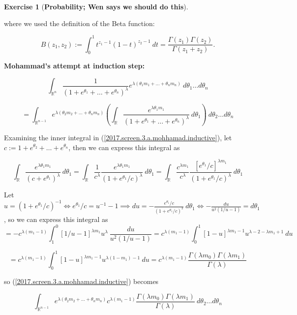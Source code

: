 \documentclass{article}
\theoremstyle{definition}
\newtheorem{exercise}{Exercise}
\theoremstyle{definition}
\theoremstyle{definition}
\theoremstyle{definition}
\begin{document}
\begin{exercise}[\textbf{Probability; Wen says we should do this}]
\begin{enumerate}[(a)]
where we used the definition of the Beta function:

\[
B(z_1, z_2) := \int_0^1 t^{z_1 - 1} (1-t)^{z_2 - 1} \ dt= \frac{ \Gamma(z_1) \Gamma(z_2)}{\Gamma(z_1 + z_2)}.
\]

\textbf{Mohammad's attempt at induction step:} 

\[
\int_{\mathbb{R}^n} \frac{1}{\left(1 + e^{\theta_1} + \ldots + e^{\theta_n} \right)^\lambda} e^{\lambda(\theta_1 m_1 + \ldots + \theta_n m_n)} \ d \theta_1 \ldots d \theta_n 
\]



\begin{equation}\label{2017.screen.3.a.mohhamad.inductive}
= \int_{\mathbb{R}^{n-1}} e^{\lambda(\theta_2 m_2 + \ldots + \theta_n m_n)} \left( \int_{\mathbb{R}} \frac{e^{\lambda \theta_1 m_1}}{\left(1 + e^{\theta_1} + \ldots + e^{\theta_n} \right)^\lambda}  \ d \theta_1 \right)  \ d\theta_2 \ldots d \theta_n
\end{equation}

Examining the inner integral in (\ref{2017.screen.3.a.mohhamad.inductive}), let \(c := 1 + e^{\theta_2} + \ldots + e^{\theta_n}\), then we can express this integral as

\[
 \int_{\mathbb{R}} \frac{e^{\lambda \theta_1 m_1}}{\left(c + e^{\theta_1} \right)^\lambda}  \ d \theta_1 =  \int_{\mathbb{R}} \frac{1}{c^\lambda} \frac{e^{\lambda \theta_1 m_1}}{\left(1 + e^{\theta_1}/c \right)^\lambda}  \ d \theta_1 =  \int_{\mathbb{R}} \frac{c^{\lambda m_1}}{c^\lambda} \frac{\left[e^{\theta_1}/c \right]^{\lambda  m_1}}{\left(1 + e^{\theta_1}/c \right)^\lambda}  \ d \theta_1
\]

Let \(u = \left(1 + e^{\theta_1}/c \right)^{-1} \iff  e^{\theta_1}/c =  u^{-1} - 1 \implies du = - \frac{e^{\theta_1}/c}{(1 + e^{\theta_1}/c )^{2} }  \ d \theta_1 \iff -\frac{du}{u^2(1/u - 1)} = d \theta_1\), so we can express this integral as
\[
=  -c^{\lambda(m_1 - 1)} \int_{1}^0 \left[1/u - 1 \right]^{\lambda  m_1} u ^ \lambda \ \frac{du}{u^2(1/u - 1)} =  c^{\lambda(m_1 - 1)} \int_{0}^1 \left[1 - u \right]^{\lambda  m_1 - 1} u ^ {\lambda - 2 - \lambda m_1 + 1} \ du
\]

\[
=  c^{\lambda(m_1 - 1)} \int_{0}^1 \left[1 - u \right]^{\lambda  m_1 - 1} u ^ {\lambda(1 - m_1) - 1} \ du =  c^{\lambda(m_1 - 1)} \frac{\Gamma(\lambda m_0)\Gamma(\lambda m_1)}{\Gamma(\lambda)}
\]

so (\ref{2017.screen.3.a.mohhamad.inductive}) becomes

\[
\int_{\mathbb{R}^{n-1}} e^{\lambda(\theta_2 m_2 + \ldots + \theta_n m_n)}  c^{\lambda(m_1 - 1)} \frac{\Gamma(\lambda m_0)\Gamma(\lambda m_1)}{\Gamma(\lambda)}  \ d\theta_2 \ldots d \theta_n
\]


\end{enumerate}
\end{exercise}
\end{document}
